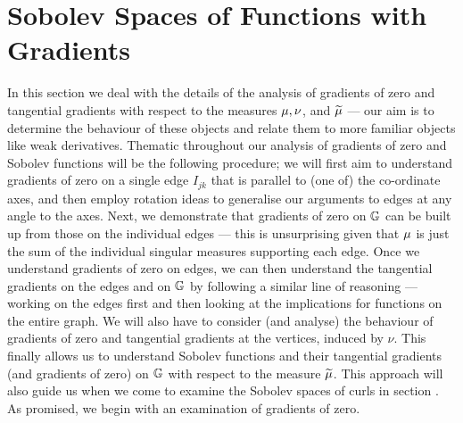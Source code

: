 \section{Sobolev Spaces of Functions with Gradients} \label{sec:3DGradSobSpaces}
In this section we deal with the details of the analysis of gradients of zero and tangential gradients with respect to the measures $\mu, \nu$, and $\widetilde{\mu}$ --- our aim is to determine the behaviour of these objects and relate them to more familiar objects like weak derivatives.
Thematic throughout our analysis of gradients of zero and Sobolev functions will be the following procedure; we will first aim to understand gradients of zero on a single edge $I_{jk}$ that is parallel to (one of) the co-ordinate axes, and then employ rotation ideas to generalise our arguments to edges at any angle to the axes.
Next, we demonstrate that gradients of zero on $\mathbb{G}$ can be built up from those on the individual edges --- this is unsurprising given that $\mu$ is just the sum of the individual singular measures supporting each edge.
Once we understand gradients of zero on edges, we can then understand the tangential gradients on the edges and on $\mathbb{G}$ by following a similar line of reasoning --- working on the edges first and then looking at the implications for functions on the entire graph.
We will also have to consider (and analyse) the behaviour of gradients of zero and tangential gradients at the vertices, induced by $\nu$.
This finally allows us to understand Sobolev functions and their tangential gradients (and gradients of zero) on $\mathbb{G}$ with respect to the measure $\widetilde{\mu}$.
This approach will also guide us when we come to examine the Sobolev spaces of curls in section .
As promised, we begin with an examination of gradients of zero.

